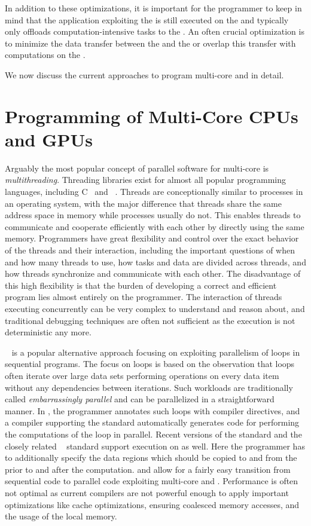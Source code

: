 In addition to these optimizations, it is important for the programmer to keep in mind that the application exploiting the \GPU is still executed on the \CPU and typically only offloads computation-intensive tasks to the \GPU.
An often crucial optimization is to minimize the data transfer between the \CPU and the \GPU or overlap this transfer with computations on the \GPU.

\bigskip

\noindent
We now discuss the current approaches to program multi-core \CPUs and \GPUs in detail.



\section{Programming of Multi-Core CPUs and GPUs}
Arguably the most popular concept of parallel software for multi-core \CPUs is \emph{multithreading}.
Threading libraries exist for almost all popular programming languages, including C~\cite{Cstandard,Pthreads} and \Cpp~\cite{Cppstandard}.
Threads are conceptionally similar to processes in an operating system, with the major difference that threads share the same address space in memory while processes usually do not.
This enables threads to communicate and cooperate efficiently with each other by directly using the same memory.
Programmers have great flexibility and control over the exact behavior of the threads and their interaction, including the important questions of when and how many threads to use, how tasks and data are divided across threads, and how threads synchronize and communicate with each other.
The disadvantage of this high flexibility is that the burden of developing a correct and efficient program lies almost entirely on the programmer.
The interaction of threads executing concurrently can be very complex to understand and reason about, and traditional debugging techniques are often not sufficient as the execution is not deterministic any more.

\OpenMP~\cite{OpenMP} is a popular alternative approach focusing on exploiting parallelism of loops in sequential programs.
The focus on loops is based on the observation that loops often iterate over large data sets performing operations on every data item without any dependencies between iterations.
Such workloads are traditionally called \emph{embarrassingly parallel} and can be parallelized in a straightforward manner.
In \OpenMP, the programmer annotates such loops with compiler directives, and a compiler supporting the \OpenMP standard automatically generates code for performing the computations of the loop in parallel.
Recent versions of the \OpenMP standard and the closely related \OpenACC~\cite{OpenACC} standard support execution on \GPUs as well.
Here the programmer has to additionally specify the data regions which should be copied to and from the \GPU prior to and after the computation.
\OpenMP and \OpenACC allow for a fairly easy transition from sequential code to parallel code exploiting multi-core \CPUs and \GPUs.
Performance is often not optimal as current compilers are not powerful enough to apply important optimizations like cache optimizations, ensuring coalesced memory accesses, and the usage of the local memory.

